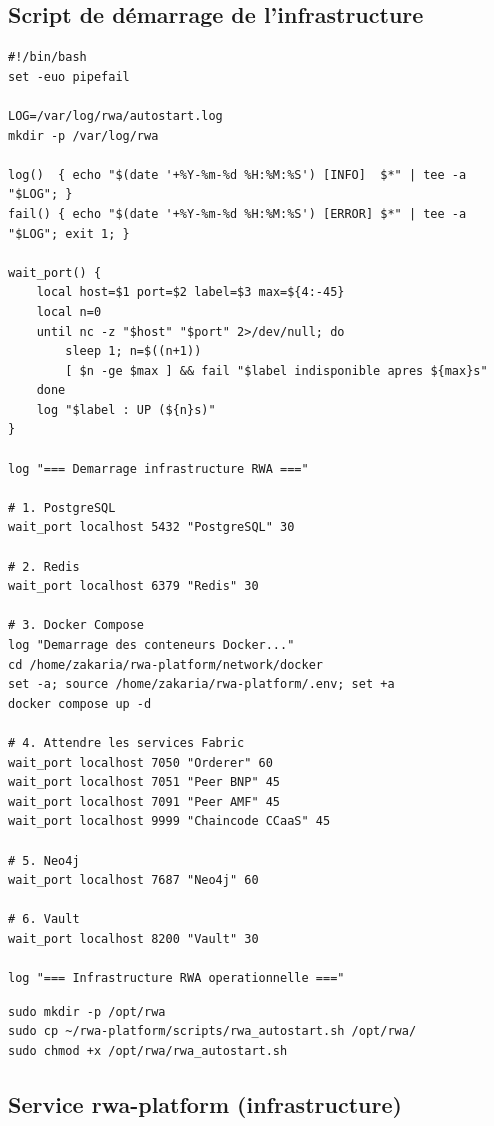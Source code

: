 \documentclass[12pt,a4paper,french]{article}
\begin{document}
\subsection{Script de démarrage de l'infrastructure}

\begin{lstlisting}[style=bash, caption={/opt/rwa/rwa\_autostart.sh}]
#!/bin/bash
set -euo pipefail

LOG=/var/log/rwa/autostart.log
mkdir -p /var/log/rwa

log()  { echo "$(date '+%Y-%m-%d %H:%M:%S') [INFO]  $*" | tee -a "$LOG"; }
fail() { echo "$(date '+%Y-%m-%d %H:%M:%S') [ERROR] $*" | tee -a "$LOG"; exit 1; }

wait_port() {
    local host=$1 port=$2 label=$3 max=${4:-45}
    local n=0
    until nc -z "$host" "$port" 2>/dev/null; do
        sleep 1; n=$((n+1))
        [ $n -ge $max ] && fail "$label indisponible apres ${max}s"
    done
    log "$label : UP (${n}s)"
}

log "=== Demarrage infrastructure RWA ==="

# 1. PostgreSQL
wait_port localhost 5432 "PostgreSQL" 30

# 2. Redis
wait_port localhost 6379 "Redis" 30

# 3. Docker Compose
log "Demarrage des conteneurs Docker..."
cd /home/zakaria/rwa-platform/network/docker
set -a; source /home/zakaria/rwa-platform/.env; set +a
docker compose up -d

# 4. Attendre les services Fabric
wait_port localhost 7050 "Orderer" 60
wait_port localhost 7051 "Peer BNP" 45
wait_port localhost 7091 "Peer AMF" 45
wait_port localhost 9999 "Chaincode CCaaS" 45

# 5. Neo4j
wait_port localhost 7687 "Neo4j" 60

# 6. Vault
wait_port localhost 8200 "Vault" 30

log "=== Infrastructure RWA operationnelle ==="
\end{lstlisting}

\begin{lstlisting}[style=bash, caption={Installer le script}]
sudo mkdir -p /opt/rwa
sudo cp ~/rwa-platform/scripts/rwa_autostart.sh /opt/rwa/
sudo chmod +x /opt/rwa/rwa_autostart.sh
\end{lstlisting}

\subsection{Service rwa-platform (infrastructure)}
\end{document}
